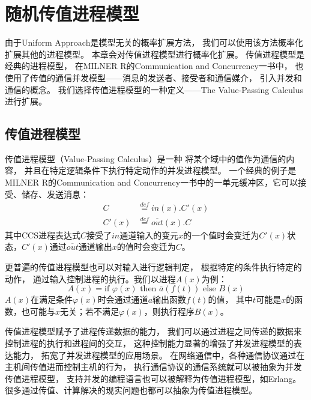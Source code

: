 
\chapter{随机传值进程模型}\label{ch:rvpc}

由于Uniform Approach是模型无关的概率扩展方法，
我们可以使用该方法概率化扩展其他的进程模型。
本章会对传值进程模型进行概率化扩展。
传值进程模型是经典的进程模型，
在MILNER R的Communication and Concurrency一书中，
也使用了传值的通信并发模型——消息的发送者、接受者和通信媒介，
引入并发和通信的概念\cite{Milner_CCS}。
我们选择传值进程模型的一种定义——The Value-Passing Calculus\cite{Fu_VPC}进行扩展。

\section{传值进程模型}
传值进程模型（Value-Passing Calculus）是一种
将某个域中的值作为通信的内容，
并且在特定逻辑条件下执行特定动作的并发进程模型。
一个经典的例子是MILNER R的Communication and Concurrency一书中的一单元缓冲区，它可以接受、储存、发送消息：
\begin{equation}
   \begin{split}
      C&\stackrel{def}{=}in(x).C'(x)\\
   C'(x)&\stackrel{def}{=}\overline{out}(x).C
   \end{split}
\end{equation}
其中CCS进程表达式$C$接受了$in$通道输入的变元$x$的一个值时会变迁为$C'(x)$状态，$C'(x)$通过$\overline{out}$通道输出$x$的值时会变迁为$C$\cite{Milner_CCS}。

更普遍的传值进程模型也可以对输入进行逻辑判定，
根据特定的条件执行特定的动作，
通过输入控制进程的执行。我们以进程$A(x)$为例：
\begin{equation}
   A(x)=\textrm{if }\varphi(x)\textrm{ then }\overline{a}(f(t))\textrm{ else }B(x)
\end{equation}
$A(x)$在满足条件$\varphi(x)$时会通过通道$a$输出函数$f(t)$的值，
其中$t$可能是$x$的函数，也可能与$x$无关；若不满足$\varphi(x)$，则执行程序$B(x)$。

传值进程模型赋予了进程传递数据的能力，
我们可以通过进程之间传递的数据来控制进程的执行和进程间的交互，
这种控制能力显著的增强了并发进程模型的表达能力，
拓宽了并发进程模型的应用场景。
在网络通信中，各种通信协议通过在主机间传值进而控制主机的行为，
执行通信协议的通信系统就可以被抽象为并发传值进程模型，
支持并发的编程语言也可以被解释为传值进程模型，如Erlang\cite{Erlang}。
很多通过传值、计算解决的现实问题也都可以抽象为传值进程模型。


